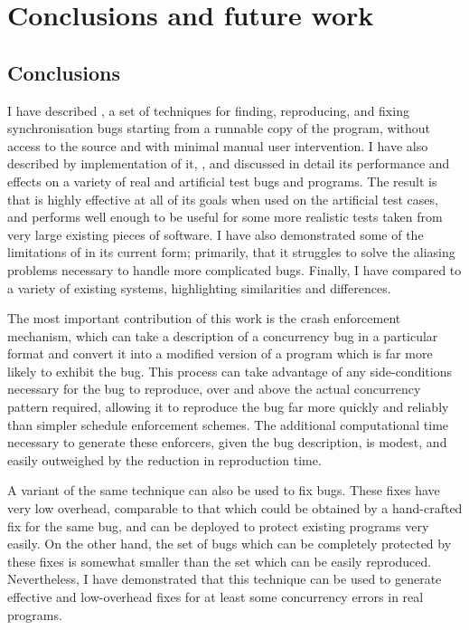 \chapter{Conclusions and future work}

\section{Conclusions}

I have described {\technique}, a set of techniques for finding,
reproducing, and fixing synchronisation bugs starting from a runnable
copy of the program, without access to the source and with minimal
manual user intervention.  I have also described by implementation of
it, {\implementation}, and discussed in detail its performance and
effects on a variety of real and artificial test bugs and programs.
The result is that {\technique} is highly effective at all of its
goals when used on the artificial test cases, and performs well enough
to be useful for some more realistic tests taken from very large
existing pieces of software.  I have also demonstrated some of the
limitations of {\technique} in its current form; primarily, that it
struggles to solve the aliasing problems necessary to handle more
complicated bugs.  Finally, I have compared {\technique} to a variety
of existing systems, highlighting similarities and differences.

The most important contribution of this work is the crash enforcement
mechanism, which can take a description of a concurrency bug in a
particular format and convert it into a modified version of a program
which is far more likely to exhibit the bug.  This process can take
advantage of any side-conditions necessary for the bug to reproduce,
over and above the actual concurrency pattern required, allowing it to
reproduce the bug far more quickly and reliably than simpler schedule
enforcement schemes.  The additional computational time necessary to
generate these enforcers, given the bug description, is modest, and
easily outweighed by the reduction in reproduction time.

A variant of the same technique can also be used to fix bugs.  These
fixes have very low overhead, comparable to that which could be
obtained by a hand-crafted fix for the same bug, and can be deployed
to protect existing programs very easily.  On the other hand, the set
of bugs which can be completely protected by these fixes is somewhat
smaller than the set which can be easily reproduced.  Nevertheless, I
have demonstrated that this technique can be used to generate
effective and low-overhead fixes for at least some concurrency errors
in real programs.

